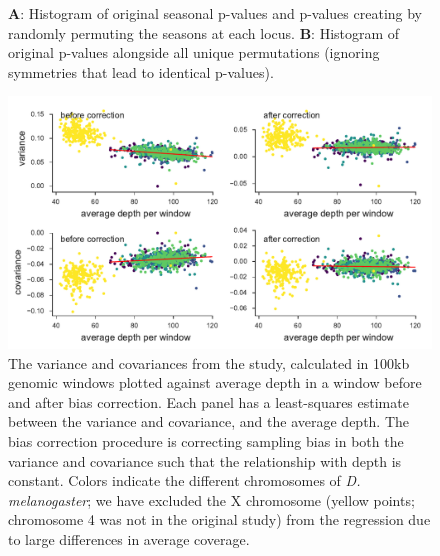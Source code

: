 \documentclass[11pt]{article}
\begin{document}
{\begin{figure}[!ht]
  \caption{\textbf{A}: Histogram of original \textcite{Bergland2014-ij}
    seasonal p-values and p-values creating by randomly permuting the seasons
    at each locus. \textbf{B}: Histogram of original \textcite{Bergland2014-ij}
    p-values alongside all unique permutations (ignoring symmetries that lead
    to identical p-values).}

  \label{suppfig:bergland-pvalue-hist}
\end{figure}


\begin{figure}[!ht]
  \centering
  \includegraphics[width=\textwidth]{figures/bergland-correction-plot.pdf}

  \caption{The variance and covariances from the \textcite{Bergland2014-ij}
    study, calculated in 100kb genomic windows plotted against average depth in
    a window before and after bias correction. Each panel has a least-squares
    estimate between the variance and covariance, and the average depth.
    The bias correction procedure is correcting sampling bias in both the variance
    and covariance such that the relationship with depth is constant. Colors
    indicate the different chromosomes of \emph{D. melanogaster}; we have
    excluded the X chromosome (yellow points; chromosome 4 was not in the
    original study) from the regression due to large differences in average
    coverage.}

  \label{suppfig:bergland-correction}
\end{figure}



}
\end{document}
